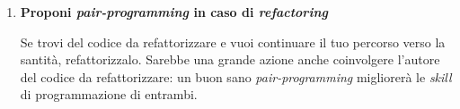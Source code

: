 \begin{enumerate}
\item \textbf{Proponi \emph{pair-programming} in caso di \emph{refactoring}}

Se trovi del codice da refattorizzare e vuoi continuare il tuo percorso verso la santità, refattorizzalo. Sarebbe una grande azione anche coinvolgere l’autore del codice da refattorizzare: un buon sano \emph{pair-programming} migliorerà le \emph{skill} di programmazione di entrambi.

\end{enumerate}